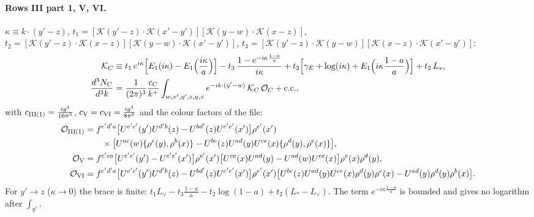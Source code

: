 \documentclass[10pt]{article}
\numberwithin{equation}{section}
\newcommand{\Lv}{L_{\vee}}
\newcommand{\Ls}{L_{*}}
\newcommand{\OO}{\mathcal O}
\newcommand{\KK}{\mathcal K}
\newcommand{\pre}{\frac{1}{(2\pi)^3}}
\begin{document}
\paragraph{Rows III part 1, V, VI.} $\kappa\equiv k\cdot(y'-z)$, $t_1=[\KK(y'-z)\cdot\KK(x'-y')][\KK(y-w)\cdot\KK(x-z)]$, $t_2=[\KK(y'-z)\cdot\KK(x-z)][\KK(y-w)\cdot\KK(x'-y')]$, $t_3=[\KK(y'-z)\cdot\KK(y-w)][\KK(x-z)\cdot\KK(x'-y')]$:
\begin{equation}
\begin{aligned}\KK_C\equiv{}&t_1\,e^{i\kappa}\Big[E_1(i\kappa)-E_1\Big(\frac{i\kappa}{a}\Big)\Big]-t_3\,\frac{1-e^{-i\kappa\frac{1-a}{a}}}{i\kappa}+t_2\Big[\gamma_E+\log(i\kappa)+E_1\Big(i\kappa\frac{1-a}{a}\Big)\Big]+t_2\,\Ls,\\
\frac{d^3N_C}{d^3k}={}&\pre\frac{c_C}{k^+}\int_{w,x',y',z,y,x}e^{-ik\cdot(y'-w)}\,\KK_C\,\OO_C+{\rm c.c.},\end{aligned}
\label{eq:Crow}
\end{equation}
with $c_{\rm III(1)}=\frac{ig^4}{16\pi^5}$, $c_{\rm V}=c_{\rm VI}=\frac{ig^4}{8\pi^5}$ and the colour factors of the file:
\begin{align*}
\OO_{\rm III(1)}&=f^{c'd'a}\big[U^{e'c'}(y')U^{d'b}(z)-U^{bd'}(z)U^{c'e'}(x')\big]\rho^{e'}(x')\\&\qquad\times\big[U^{ac}(w)\{\rho^c(y),\rho^b(x)\}-U^{bc}(z)U^{ad}(y)U^{ce}(x)\{\rho^d(y),\rho^e(x)\}\big],\\
\OO_{\rm V}&=f^{c'ca}\big[U^{e'c'}(y')-U^{c'e'}(x')\big]\rho^{e'}(x')\big[U^{ce}(x)U^{ad}(y)-U^{ad}(w)U^{ce}(x)\big]\rho^e(x)\rho^d(y),\\
\OO_{\rm VI}&=f^{c'd'a}\big[U^{e'c'}(y')U^{d'b}(z)-U^{bd'}(z)U^{c'e'}(x')\big]\rho^{e'}(x')\big[U^{bc}(z)U^{ad}(y)U^{ce}(x)\rho^d(y)\rho^e(x)-U^{ad}(y)\rho^d(y)\rho^b(x)\big].
\end{align*}
For $y'\to z$ ($\kappa\to0$) the brace is finite: $t_1\Lv-t_3\frac{1-a}{a}-t_2\log(1-a)+t_2(\Ls-\Lv)$. The term $e^{-i\kappa\frac{1-a}{a}}$ is bounded and gives no logarithm after $\int_{y'}$.
\end{document}
